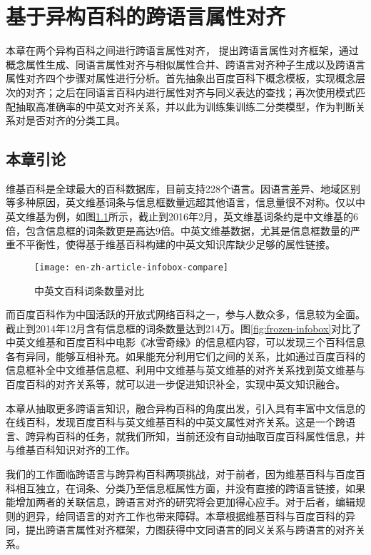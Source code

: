 \chapter{基于异构百科的跨语言属性对齐}
\label{cha:property-matching}
本章在两个异构百科之间进行跨语言属性对齐，
提出跨语言属性对齐框架，通过概念属性生成、同语言属性对齐与相似属性合并、跨语言对齐种子生成以及跨语言属性对齐四个步骤对属性进行分析。首先抽象出百度百科下概念模板，实现概念层次的对齐；之后在同语言百科内进行属性对齐与同义表达的查找；再次使用模式匹配抽取高准确率的中英文对齐关系，并以此为训练集训练二分类模型，作为判断关系对是否对齐的分类工具。 

\section{本章引论}
维基百科是全球最大的百科数据库，目前支持228个语言。因语言差异、地域区别等多种原因，英文维基词条与信息框数量远超其他语言，信息量很不对称。仅以中英文维基为例，如图\ref{fig:en-zh-article-infobox-compare}所示，截止到2016年2月，英文维基词条约是中文维基的6倍，包含信息框的词条数更是高达9倍。中英文维基数据，尤其是信息框数量的严重不平衡性，使得基于维基百科构建的中英文知识库缺少足够的属性链接。

\begin{figure}[h]
  \centering
  \texttt{[image: en-zh-article-infobox-compare]}
  \caption{中英文百科词条数量对比}
  \label{fig:en-zh-article-infobox-compare}
\end{figure}


而百度百科作为中国活跃的开放式网络百科之一，参与人数众多，信息较为全面。截止到2014年12月含有信息框的词条数量达到214万。图\ref{fig:frozen-infobox}对比了中英文维基和百度百科中电影《冰雪奇缘》的信息框内容，可以发现三个百科信息各有异同，能够互相补充。如果能充分利用它们之间的关系，比如通过百度百科的信息框补全中文维基信息框、利用中文维基与英文维基的对齐关系找到英文维基与百度百科的对齐关系等，就可以进一步促进知识补全，实现中英文知识融合。

本章从抽取更多跨语言知识，融合异构百科的角度出发，引入具有丰富中文信息的在线百科，发现百度百科与英文维基百科的中英文属性对齐关系。这是一个跨语言、跨异构百科的任务，就我们所知，当前还没有自动抽取百度百科属性信息，并与维基百科知识对齐的工作。

我们的工作面临跨语言与跨异构百科两项挑战，对于前者，因为维基百科与百度百科相互独立，在词条、分类乃至信息框属性方面，并没有直接的跨语言链接，如果能增加两者的关联信息，跨语言对齐的研究将会更加得心应手。对于后者，编辑规则的迥异，给同语言的对齐工作也带来障碍。本章根据维基百科与百度百科的异同，提出跨语言属性对齐框架，力图获得中文同语言的同义关系与跨语言的对齐关系。

